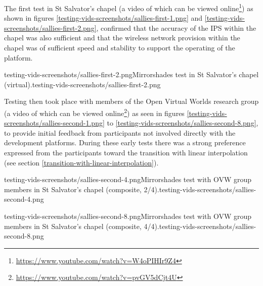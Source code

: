 
The first test in St Salvator's chapel (a video of which can be viewed online\footnote{\url{https://www.youtube.com/watch?v=W4oPIHIr9Z4}}) as shown in figures \ref{testing-vids-screenshots/sallies-first-1.png} and \ref{testing-vids-screenshots/sallies-first-2.png}, confirmed that the accuracy of the IPS within the chapel was also sufficient and that the wireless network provision within the chapel was of sufficient speed and stability to support the operating of the platform.

       {testing-vids-screenshots/sallies-first-2.png}{Mirrorshades test in St Salvator's chapel (virtual).}{testing-vids-screenshots/sallies-first-2.png}

Testing then took place with members of the Open Virtual Worlds research group (a video of which can be viewed online\footnote{\url{https://www.youtube.com/watch?v=pvGV5dCjt4U}}) as seen in figures \ref{testing-vids-screenshots/sallies-second-1.png} to \ref{testing-vids-screenshots/sallies-second-8.png}, to provide initial feedback from participants not involved directly with the development platforms. During these early tests there was a strong preference expressed from the participants toward the transition with linear interpolation (see section \ref{transition-with-linear-interpolation}).

       {testing-vids-screenshots/sallies-second-4.png}{Mirrorshades test with OVW group members in St Salvator's chapel (composite, 2/4).}{testing-vids-screenshots/sallies-second-4.png}


       {testing-vids-screenshots/sallies-second-8.png}{Mirrorshades test with OVW group members in St Salvator's chapel (composite, 4/4).}{testing-vids-screenshots/sallies-second-8.png}

